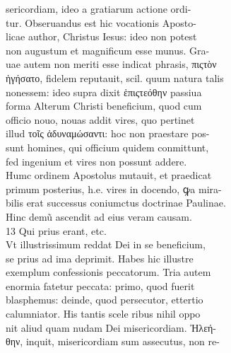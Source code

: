 \documentclass{article}
\begin{document}
\begin{pages}
                sericordiam, ideo a gratiarum actione ordi- \\
                tur. Obseruandus est hic vocationis Aposto- \\
                licae author, Christus Iesus: ideo non potest \\
                non augustum et magnificum esse munus. Gra- \\
                uae autem non meriti esse indicat phrasis, πιςτὸν \\
                ἡγήσατο, fidelem reputauit, scil. quum natura talis \\
                nonessem: ideo supra dixit ἑπιςτεόθην passiua \\
                forma Alterum Christi beneficium, quod cum \\
                officio nouo, nouas addit vires, quo pertinet \\
                illud τοῖς ἀδυναμώσαντι: hoc non praestare pos- \\
                sunt homines, qui officium quidem conmittunt, \\
                fed ingenium et vires non possunt addere. \\
                Humc ordinem Apostolus mutauit, et praedicat \\
                primum posterius, h.e. vires in docendo, ꝙa mira- \\
                bilis erat successus coniumctus doctrinae Paulinae. \\
                Hinc demũ ascendit ad eius veram causam. \\
                13 Qui prius erant, etc. \\
                Vt illustrissimum reddat Dei in se beneficium, \\
                se prius ad ima deprimit. Habes hic illustre \\
                exemplum confessionis peccatorum. Tria autem \\
                enormia fatetur peccata: primo, quod fuerit \\
                blasphemus: deinde, quod persecutor, ettertio \\
                calumniator. His tantis scele ribus nihil oppo \\
                nit aliud quam nudam Dei misericordiam. Ἠλεή- \\
                θην, inquit, misericordiam sum assecutus, non re- \\

\end{pages}
\end{document}
